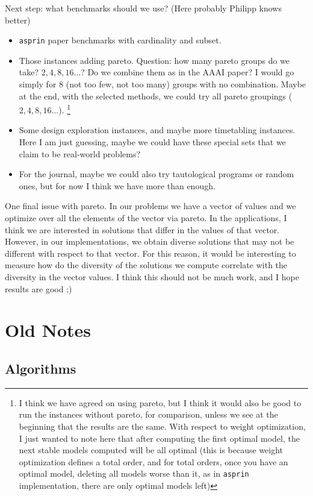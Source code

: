 \documentclass[a4paper,10pt]{article}
\begin{document}
Next step: what benchmarks should we use? (Here probably Philipp knows better)
\begin{itemize}
\item
\texttt{asprin} paper benchmarks with cardinality and subset.
\item
Those instances adding pareto.
Question: how many pareto groups do we take? $2, 4, 8, 16\ldots$?
Do we combine them as in the AAAI paper?
I would go simply for $8$ (not too few, not too many) groups with no combination.
Maybe at the end, with the selected methods, we could try all pareto groupings ($2, 4, 8, 16\ldots$).
\footnote{
I think we have agreed on using pareto, 
but I think it would also be good to run the instances without pareto, for comparison, 
unless we see at the beginning that the results are the same.
With respect to weight optimization, I just wanted to note here that 
after computing the first optimal model, the next stable models computed will be all optimal
(this is because weight optimization defines a total order, 
and for total orders, once you have an optimal model, 
deleting all models worse than it, as in \texttt{asprin} implementation, there are only optimal models left)
}
\item
Some design exploration instances, and maybe more timetabling instances.
Here I am just guessing, maybe we could have these special sets that we claim to be real-world problems?
\item
For the journal, maybe we could also try tautological programs or random ones, 
but for now I think we have more than enough.
\end{itemize}

One final issue with pareto. 
In our problems we have a vector of values and we optimize over all the elements of the vector via pareto.
In the applications, I think we are interested in solutions that differ in the values of that vector.
However, in our implementations, we obtain diverse solutions that may not be different with respect to that vector.
For this reason, it would be interesting to measure how do the diversity of the solutions we compute correlate 
with the diversity in the vector values. 
I think this should not be much work, and I hope results are good ;)



\section{Old Notes}\label{sec:oldnotes}

\subsection{Algorithms} 
\end{document}
